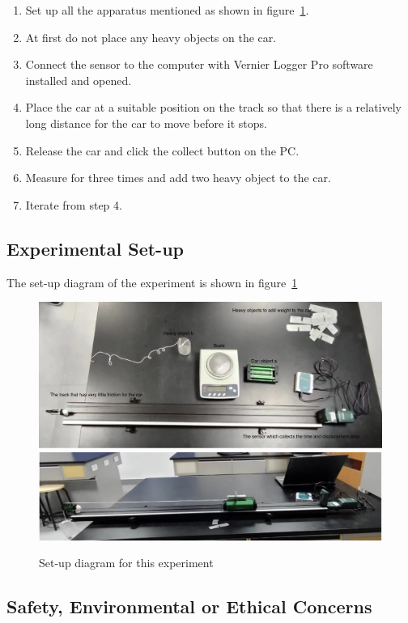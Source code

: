 \documentclass{article}
\begin{document}
\begin{enumerate}
  \item Set up all the apparatus mentioned as shown in figure~\ref{fig:setup}.
  \item At first do not place any heavy objects on the car.
  \item Connect the sensor to the computer with Vernier Logger Pro software installed and opened.
  \item Place the car at a suitable position on the track so that there is a relatively long distance for the car to move before it stops.
  \item Release the car and click the collect button on the PC.
  \item Measure for three times and add two heavy object to the car.
  \item Iterate from step 4.
\end{enumerate}

\subsection{Experimental Set-up}

The set-up diagram of the experiment is shown in figure~\ref{fig:setup}

\begin{figure}[htb]
  \centering
  \includegraphics[width=.78\hsize]{setup01.jpeg}\\
  \includegraphics[width=.78\hsize]{setup02.jpeg}
  \caption{Set-up diagram for this experiment}
  \label{fig:setup}
\end{figure}

\subsection{Safety, Environmental or Ethical Concerns}
\end{document}
